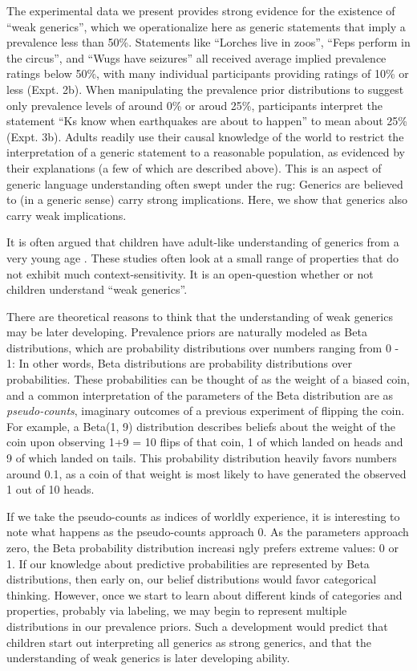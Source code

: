 \documentclass[,man,floatsintext]{apa6}
\theoremstyle{definition}
\theoremstyle{definition}
\theoremstyle{definition}
\theoremstyle{remark}
\begin{document}
The experimental data we present provides strong evidence for the
existence of \enquote{weak generics}, which we operationalize here as
generic statements that imply a prevalence less than 50\%. Statements
like \enquote{Lorches live in zoos}, \enquote{Feps perform in the
circus}, and \enquote{Wugs have seizures} all received average implied
prevalence ratings below 50\%, with many individual participants
providing ratings of 10\% or less (Expt. 2b). When manipulating the
prevalence prior distributions to suggest only prevalence levels of
around 0\% or aroud 25\%, participants interpret the statement
\enquote{Ks know when earthquakes are about to happen} to mean about
25\% (Expt. 3b). Adults readily use their causal knowledge of the world
to restrict the interpretation of a generic statement to a reasonable
population, as evidenced by their explanations (a few of which are
described above). This is an aspect of generic language understanding
often swept under the rug: Generics are believed to (in a generic sense)
carry strong implications. Here, we show that generics also carry weak
implications.

It is often argued that children have adult-like understanding of
generics from a very young age
. These studies often look
at a small range of properties that do not exhibit much
context-sensitivity. It is an open-question whether or not children
understand \enquote{weak generics}.

There are theoretical reasons to think that the understanding of weak
generics may be later developing. Prevalence priors are naturally
modeled as Beta distributions, which are probability distributions over
numbers ranging from 0 - 1: In other words, Beta distributions are
probability distributions over probabilities. These probabilities can be
thought of as the weight of a biased coin, and a common interpretation
of the parameters of the Beta distribution are as \emph{pseudo-counts},
imaginary outcomes of a previous experiment of flipping the coin. For
example, a Beta(1, 9) distribution describes beliefs about the weight of
the coin upon observing 1+9 = 10 flips of that coin, 1 of which landed
on heads and 9 of which landed on tails. This probability distribution
heavily favors numbers around 0.1, as a coin of that weight is most
likely to have generated the observed 1 out of 10 heads.

If we take the pseudo-counts as indices of worldly experience, it is
interesting to note what happens as the pseudo-counts approach 0. As the
parameters approach zero, the Beta probability distribution increasi
ngly prefers extreme values: 0 or 1. If our knowledge about predictive
probabilities are represented by Beta distributions, then early on, our
belief distributions would favor categorical thinking. However, once we
start to learn about different kinds of categories and properties,
probably via labeling, we may begin to represent multiple distributions
in our prevalence priors. Such a development would predict that children
start out interpreting all generics as strong generics, and that the
understanding of weak generics is later developing ability.
\end{document}
